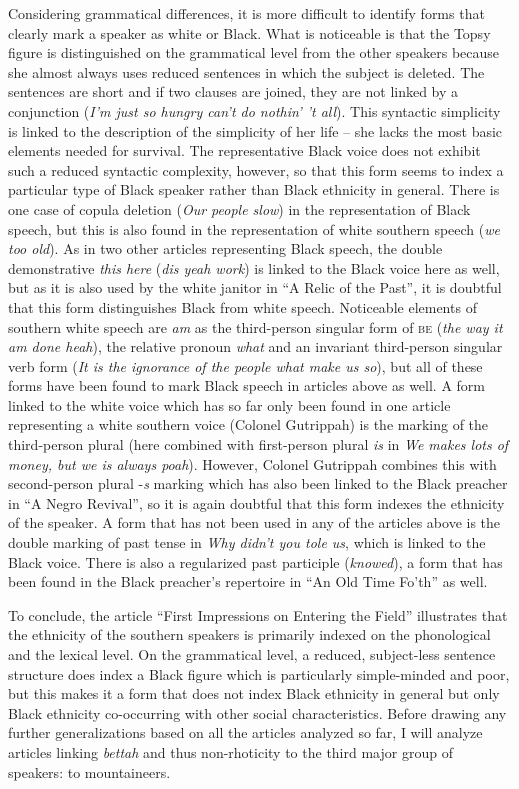 Considering grammatical differences, it is more difficult to identify forms that clearly mark a speaker as white or Black. What is noticeable is that the Topsy figure is distinguished on the grammatical level from the other speakers because she almost always uses reduced sentences in which the subject is deleted. The sentences are short and if two clauses are joined, they are not linked by a conjunction (\emph{I’m just so hungry can’t do nothin’ ’t all}). This syntactic simplicity is linked to the description of the simplicity of her life – she lacks the most basic elements needed for survival. The representative Black voice does not exhibit such a reduced syntactic complexity, however, so that this form seems to index a particular type of Black speaker rather than Black ethnicity in general. There is one case of copula deletion (\emph{Our people slow}) in the representation of Black speech, but this is also found in the representation of white southern speech (\emph{we too old}). As in two other articles representing Black speech, the double demonstrative \emph{this here} (\emph{dis yeah work}) is linked to the Black voice here as well, but as it is also used by the white janitor in “A Relic of the Past”, it is doubtful that this form distinguishes Black from white speech. Noticeable elements of southern white speech are \emph{am} as the third-person singular form of \textsc{be} (\emph{the way it am done heah}), the relative pronoun \emph{what} and an invariant third-person singular verb form (\emph{It is the ignorance of the people what make us so}), but all of these forms have been found to mark Black speech in articles above as well. A form linked to the white voice which has so far only been found in one article representing a white southern voice (Colonel Gutrippah) is the marking of the third-person plural (here combined with first-person plural \emph{is} in \emph{We makes lots of money, but we is always poah}). However, Colonel Gutrippah combines this with second-person plural -\emph{s} marking which has also been linked to the Black preacher in “A Negro Revival”, so it is again doubtful that this form indexes the ethnicity of the speaker. A form that has not been used in any of the articles above is the double marking of past tense in \emph{Why didn’t you tole us}, which is linked to the Black voice. There is also a regularized past participle (\emph{knowed}), a form that has been found in the Black preacher’s repertoire in “An Old Time Fo’th” as well.

To conclude, the article “First Impressions on Entering the Field” illustrates that the ethnicity of the southern speakers is primarily indexed on the phonological and the lexical level. On the grammatical level, a reduced, subject-less sentence structure does index a Black figure which is particularly simple-minded and poor, but this makes it a form that does not index Black ethnicity in general but only Black ethnicity co-occurring with other social characteristics. Before drawing any further generalizations based on all the articles analyzed so far, I will analyze articles linking \emph{bettah} and thus non-rhoticity to the third major group of speakers: to mountaineers.

